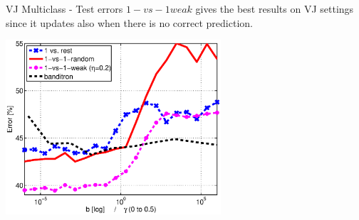\documentclass{beamer}
\begin{document}
\begin{frame}{VJ Multiclass - Test errors}
$1-vs-1 weak$ gives the best results on VJ settings since it updates also when 
there is no  correct prediction.

\begin{centering}
\includegraphics[width=0.6\textwidth]{figs/VJ_three_methods.eps}

\end{centering}
\end{frame}


%
%

%
%
%
\end{document}

